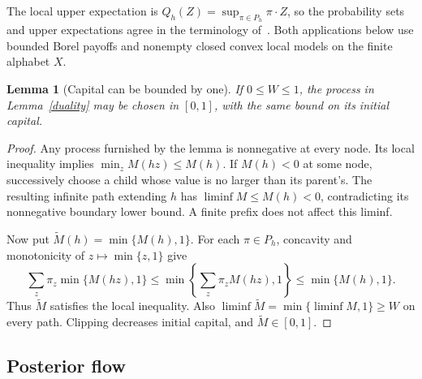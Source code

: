 \documentclass[11pt,a4paper]{article}
\newtheorem{lemma}[theorem]{Lemma}
\theoremstyle{definition}
\theoremstyle{remark}
\begin{document}
The local upper expectation is $Q_h(Z)=\sup_{\pi\in P_h}\pi\cdot Z$,
so the probability sets and upper expectations agree in the terminology
of~\cite{TDB}. Both applications below use bounded Borel payoffs and
nonempty closed convex local models on the finite alphabet $X$.

\begin{lemma}[Capital can be bounded by one]\label{clip}
If $0\leq W\leq1$, the process in Lemma~\ref{duality} may be chosen in
$[0,1]$, with the same bound on its initial capital.
\end{lemma}
\begin{proof}
Any process furnished by the lemma is nonnegative at every node. Its
local inequality implies $\min_z M(hz)\leq M(h)$. If $M(h)<0$ at some
node, successively choose a child whose value is no larger than its
parent's. The resulting infinite path extending $h$ has
$\liminf M\leq M(h)<0$, contradicting its nonnegative boundary lower
bound. A finite prefix does not affect this liminf.

Now put $\widetilde M(h)=\min\{M(h),1\}$. For each $\pi\in P_h$,
concavity and monotonicity of $z\mapsto\min\{z,1\}$ give
\[
 \sum_z\pi_z\min\{M(hz),1\}
 \leq\min\left\{\sum_z\pi_zM(hz),1\right\}
 \leq\min\{M(h),1\}.
\]
Thus $\widetilde M$ satisfies the local inequality. Also
$\liminf\widetilde M=\min\{\liminf M,1\}\geq W$ on every path.
Clipping decreases initial capital, and $\widetilde M\in[0,1]$.
\end{proof}

\subsection{Posterior flow}
\end{document}
